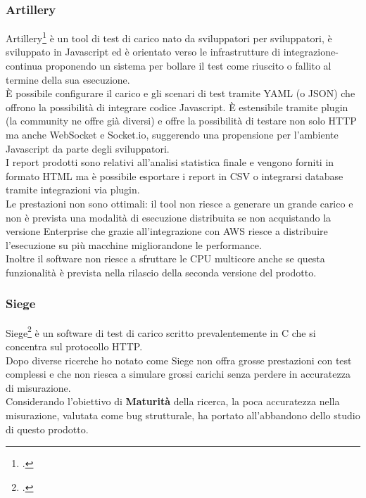 \subsubsection{Artillery}
Artillery\footcite{site:artillery} è un tool di test di carico nato da sviluppatori per sviluppatori, è sviluppato in Javascript ed è orientato verso le infrastrutture di \gls{integrazione-continua} proponendo un sistema per bollare il test come riuscito o fallito al termine della sua esecuzione. \\
È possibile configurare il carico e gli scenari di test tramite YAML (o JSON) che offrono la possibilità di integrare codice Javascript.
È estensibile tramite \gls{plugin} (la community ne offre già diversi) e offre la possibilità di testare non solo HTTP ma anche WebSocket e Socket.io, suggerendo una propensione per l'ambiente Javascript da parte degli sviluppatori. \\
I report prodotti sono relativi all'analisi statistica finale e vengono forniti in formato HTML ma è possibile esportare i report in CSV o integrarsi database tramite integrazioni via \gls{plugin}. \\
Le prestazioni non sono ottimali: il tool non riesce a generare un grande carico e non è prevista una modalità di esecuzione distribuita se non acquistando la versione Enterprise che grazie all'integrazione con AWS riesce a distribuire l'esecuzione su più macchine migliorandone le performance. \\
Inoltre il software non riesce a sfruttare le CPU multicore anche se questa funzionalità è prevista nella rilascio della seconda versione del prodotto.
\subsubsection{Siege}
Siege\footcite{site:siege} è un software di test di carico scritto prevalentemente in C che si concentra sul protocollo HTTP.\\
Dopo diverse ricerche ho notato come Siege non offra grosse prestazioni con test complessi e che non riesca a simulare grossi carichi senza perdere in accuratezza di misurazione.\\
Considerando l'obiettivo di \textbf{Maturità} della ricerca, la poca accuratezza nella misurazione, valutata come bug strutturale, ha portato all'abbandono dello studio di questo prodotto.
